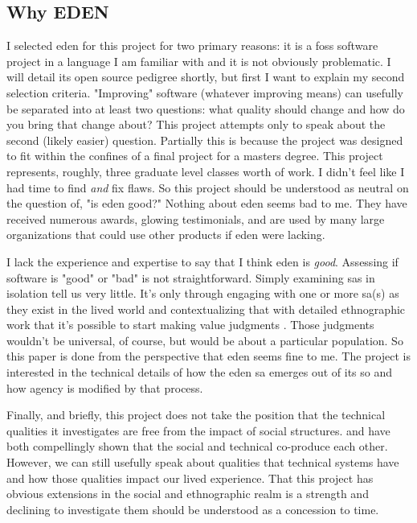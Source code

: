 \documentclass[a4paper,man,natbib]{apa6}
\begin{document}
   \subsection*{Why EDEN}
   I selected \acrshort{eden} for this project for two primary reasons: it is a \acrlong{foss} software project in a language I am familiar with and it is not obviously problematic. I will detail its open source pedigree shortly, but first I want to explain my second selection criteria. "Improving" software (whatever improving means) can usefully be separated into at least two questions: what quality should change and how do you bring that change about? This project attempts only to speak about the second (likely easier) question. Partially this is because the project was designed to fit within the confines of a final project for a masters degree. This project represents, roughly, three graduate level classes worth of work. I didn't feel like I had time to find \textit{and} fix flaws. So this project should be understood as neutral on the question of, "is \acrshort{eden} good?" Nothing about \acrshort{eden} seems bad to me. They have received numerous awards, glowing testimonials, and are used by many large organizations that could use other products if \acrshort{eden} were lacking. 

   I lack the experience and expertise to say that I think \acrshort{eden} is \textit{good}. Assessing if software is "good" or "bad" is not straightforward. Simply examining \glspl{sa} in isolation tell us very little. It's only through engaging with one or more \gls{sa}(s) as they exist in the lived world and contextualizing that with detailed ethnographic work that it's possible to start making value judgments \citep{Eubanks2018-hc,Schull2012-nc}. Those judgments wouldn't be universal, of course, but would be about a particular population. So this paper is done from the perspective that \acrshort{eden} seems fine to me. The project is interested in the technical details of how the \acrshort{eden} \gls{sa} emerges out of its \gls{so} and how agency is modified by that process. 

   Finally, and briefly, this project does not take the position that the technical qualities it investigates are free from the impact of social structures. \citet{Gabriella_Coleman2012-lq} and \citet{Kelty2008-jm} have both compellingly shown that the social and technical co-produce each other. However, we can still usefully speak about qualities that technical systems have and how those qualities impact our lived experience. That this project has obvious extensions in the social and ethnographic realm is a strength and declining to investigate them should be understood as a concession to time.
\end{document}
